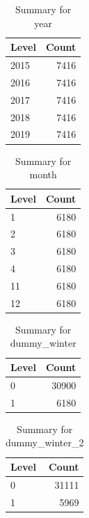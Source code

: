 \begin{table}[ht]
\centering
\begin{tabular}{lr}
  \hline
Level & Count \\ 
  \hline
2015 & 7416 \\ 
  2016 & 7416 \\ 
  2017 & 7416 \\ 
  2018 & 7416 \\ 
  2019 & 7416 \\ 
   \hline
\end{tabular}
\caption{Summary for year} 
\label{tab: year}
\end{table}
\begin{table}[ht]
\centering
\begin{tabular}{lr}
  \hline
Level & Count \\ 
  \hline
1 & 6180 \\ 
  2 & 6180 \\ 
  3 & 6180 \\ 
  4 & 6180 \\ 
  11 & 6180 \\ 
  12 & 6180 \\ 
   \hline
\end{tabular}
\caption{Summary for month} 
\label{tab: month}
\end{table}
\begin{table}[ht]
\centering
\begin{tabular}{lr}
  \hline
Level & Count \\ 
  \hline
0 & 30900 \\ 
  1 & 6180 \\ 
   \hline
\end{tabular}
\caption{Summary for dummy_winter} 
\label{tab: dummy_winter}
\end{table}
\begin{table}[ht]
\centering
\begin{tabular}{lr}
  \hline
Level & Count \\ 
  \hline
0 & 31111 \\ 
  1 & 5969 \\ 
   \hline
\end{tabular}
\caption{Summary for dummy_winter_2} 
\label{tab: dummy_winter_2}
\end{table}
